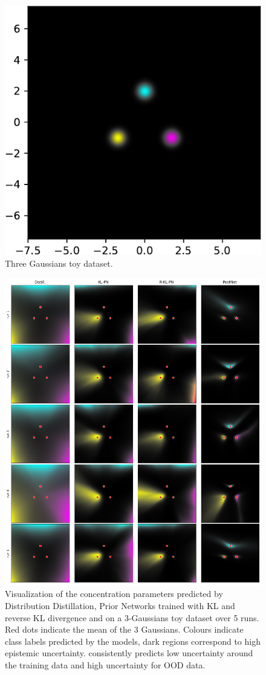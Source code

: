 \begin{figure}[ht]
    \centering
        \includegraphics[width= 0.25 \columnwidth]{sections/006_neurips2020/figures/three_gaussians_dataset-crop.pdf}
        
    \caption{Three Gaussians toy dataset.}
    \label{visualization_gaussians}
\end{figure}

\begin{figure}[ht]
    \centering
        \includegraphics[width=1. \textwidth]{sections/006_neurips2020/figures/visualization-grid.png}
        
    \caption{Visualization of the concentration parameters predicted by Distribution Distillation, Prior Networks trained with KL and reverse KL divergence and \PostNet on a 3-Gaussians toy dataset over 5 runs. Red dots indicate the mean of the 3 Gaussians. Colours indicate class labels predicted by the models, dark regions correspond to high epistemic uncertainty. \PostNetacro consistently predicts low uncertainty around the training data and high uncertainty for OOD data.}
    \label{fig:visualization_grid}
\end{figure}


